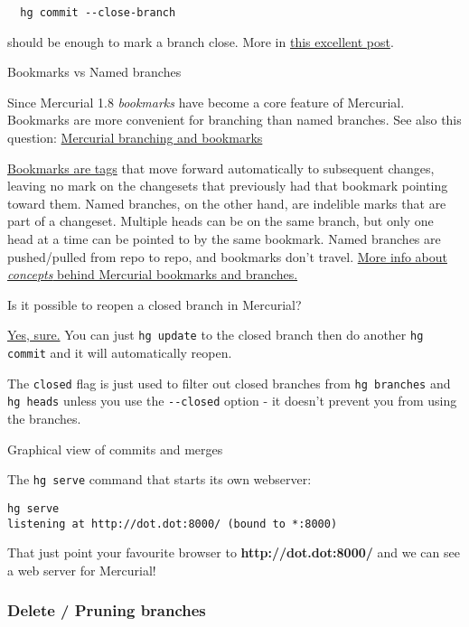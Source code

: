 \begin{verbatim}
  hg commit --close-branch
\end{verbatim}
should be enough to mark a branch close. More in
\href{http://stackoverflow.com/questions/2237222/how-to-correctly-close-a-feature-branch-in-mercurial?rq=1}{this excellent post}.

Bookmarks vs Named branches

Since Mercurial 1.8 \emph{bookmarks} have become a core feature of
Mercurial. Bookmarks are more convenient for branching than named
branches. See also this question:
\href{http://stackoverflow.com/questions/1780778/mercurial-branching-and-bookmarks}{Mercurial branching and bookmarks}

\href{http://stackoverflow.com/questions/1780778/mercurial-branching-and-bookmarks?lq=1}{Bookmarks are tags}
that move forward automatically to subsequent changes, leaving no
mark on the changesets that previously had that bookmark pointing
toward them. Named branches, on the other hand, are indelible marks
that are part of a changeset. Multiple heads can be on the same
branch, but only one head at a time can be pointed to by the same
bookmark. Named branches are pushed/pulled from repo to repo, and
bookmarks don't travel.
\href{http://stevelosh.com/blog/2009/08/a-guide-to-branching-in-mercurial/}{More info about \emph{concepts} behind Mercurial bookmarks and branches.}

Is it possible to reopen a closed branch in Mercurial?

\href{http://stackoverflow.com/questions/4099345/is-it-possible-to-reopen-a-closed-branch-in-mercurial}{Yes, sure.}
You can just \verb!hg update! to the closed branch then do another
\verb!hg commit! and it will automatically reopen.

The \verb!closed! flag is just used to filter out closed branches
from \verb!hg branches! and \verb!hg heads! unless you use the
\verb!--closed! option - it doesn't prevent you from using the
branches.

Graphical view of commits and merges

The \verb!hg serve! command that starts its own webserver:

\begin{verbatim}
hg serve
listening at http://dot.dot:8000/ (bound to *:8000)
\end{verbatim}
That just point your favourite browser to
\textbf{http://dot.dot:8000/} and we can see a web server for
Mercurial!

\subsubsection{Delete / Pruning branches}

